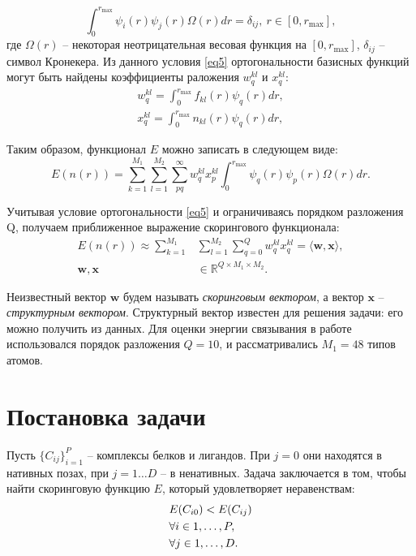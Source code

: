 \documentclass[12pt,twoside]{article}
\begin{document}
\begin{equation}\label{eq5}
\int_{0}^{r_{\text{max}}}\psi_i(r)\psi_j(r)\Omega(r)dr = \delta_{ij}, \ r\in[0,r_{\text{max}}],
\end{equation}
где $\Omega(r)$ -- некоторая неотрицательная весовая функция на $[0,r_{\text{max}}]$, $\delta_{ij}$ -- символ Кронекера. Из данного условия \eqref{eq5} ортогональности базисных функций могут быть найдены коэффициенты раложения $w_q^{kl}$ и $x_q^{kl}$:
\begin{equation}\label{eq6}
\begin{split}
w_q^{kl}=\int_{0}^{r_{\text{max}}}f_{kl}(r)\psi_q(r)dr, \\
x_q^{kl}=\int_{0}^{r_{\text{max}}}n_{kl}(r)\psi_q(r)dr,
\end{split}
\end{equation}

Таким образом, функционал $E$ можно записать в следующем виде:
\begin{equation}\label{eq7}
E(n(r)) = \sum_{k=1}^{M_1} \sum_{l=1}^{M_2} \sum_{pq}^{\infty}w_q^{kl}x_p^{kl}\int_{0}^{r_{\text{max}}}\psi_q(r)\psi_p(r)\Omega(r)dr.
\end{equation}

Учитывая условие ортогональности \eqref{eq5} и ограничиваясь порядком разложения Q, получаем приближенное выражение скорингового функционала: 
\begin{equation}\label{eq8}
\begin{split}
E(n(r)) \approx \sum_{k=1}^{M_1} & \sum_{l=1}^{M_2} \sum_{q=0}^{Q}w_q^{kl}x_q^{kl} = \langle\mathbf{w},\mathbf{x}\rangle,\\
\mathbf{w}, \mathbf{x} & \in \mathbb{R}^{Q\times M_1\times M_2}.
\end{split}
\end{equation}

Неизвестный вектор $\mathbf{w}$ будем называть \textit{скоринговым вектором}, а вектор $\mathbf{x}$ -- \textit{структурным вектором}. Структурный вектор известен для решения задачи: его можно получить из данных. Для оценки энергии связывания в работе \cite{regression} использовался порядок разложения $Q=10$, и рассматривались $M_1 = 48$ типов атомов.

\section{Постановка задачи}
Пусть $\{C_{ij}\}_{i=1}^P$ -- комплексы белков и лигандов. При $j=0$ они находятся в нативных позах, при $j = 1 \dots D$ -- в ненативных. Задача заключается в том, чтобы найти скоринговую функцию $E$, который удовлетворяет неравенствам: 
\begin{equation}\\
\begin{split}
& E(C_{i0}) < E(C_{ij}) \\
& \forall i\in 1,\dots,P, \\
& \forall j\in 1,\dots,D.
\end{split}
\end{equation}
\end{document}
